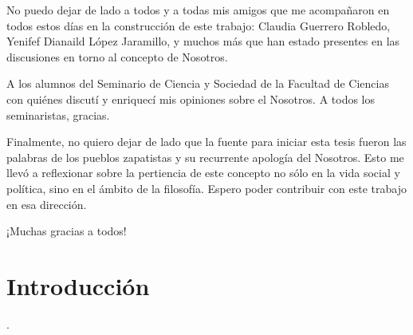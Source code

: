 \documentclass[oneside]{book}
\begin{document}
        No puedo dejar de lado a todos y a todas mis amigos que me acompañaron en todos estos días en la construcción de este trabajo: Claudia Guerrero Robledo, Yenifef Dianaild López Jaramillo, y muchos más que han estado presentes en las discusiones en torno al concepto de Nosotros.

        A los alumnos del Seminario de Ciencia y Sociedad de la Facultad de Ciencias con quiénes discutí y enriquecí mis opiniones sobre el Nosotros. A todos los seminaristas, gracias.

        Finalmente, no quiero dejar de lado que la fuente para iniciar esta tesis fueron las palabras de los pueblos zapatistas y su recurrente apología del Nosotros. Esto me llevó a reflexionar sobre la pertiencia de este concepto no sólo en la vida social y política, sino en el ámbito de la filosofía. Espero poder contribuir con este trabajo en esa dirección. 
    
¡Muchas gracias a todos!
\pagestyle{fancy}
\fancyhf{}
\lhead[\textit{\small{\rightmark}}]{\textit{\small{\rightmark}}}
\rhead[\thepage]{\thepage}

\fancyhead[lo]{\slshape\nouppercase{\rightmark}}
\fancyhead[re]{\slshape\nouppercase{\leftmark}}

\renewcommand{\footrulewidth}{0.5pt}
\tableofcontents
\setcounter{tocdepth}{3} %
\mainmatter %

\chapter*{Introducción}
.
\end{document}
